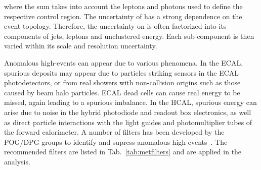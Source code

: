 where the sum takes into account the leptons and photons used to define the respective control region.
The uncertainty of \ptmiss has a strong dependence on the
event topology. Therefore, the uncertainty on \ptmiss is often factorized into its components of
jets, leptons and unclustered energy. Each sub-component is then varied
within its scale and resolution uncertainty. 

Anomalous high-\ptmiss events can appear due to various phenomena.
In the ECAL, spurious deposits may appear due to particles striking
sensors in the ECAL photodetectors, or from real showers with non-collision
origins such as those caused by beam halo particles. ECAL dead cells can cause real
energy to be missed, again leading to a spurious imbalance.
In the HCAL, spurious energy can arise due to  noise in the hybrid
photodiode and readout box  electronics, as well as
direct particle interactions with  the light guides and
photomultiplier tubes of the forward calorimeter. 
A number of filters has been developed by the POG/DPG groups to identify and supress anomalous high
\ptmiss events~\cite{CMS-JME-TWIKI-FILTER}. The recommended filters are listed in Tab.~\ref{tab:metfilters} and are applied in the analysis.

